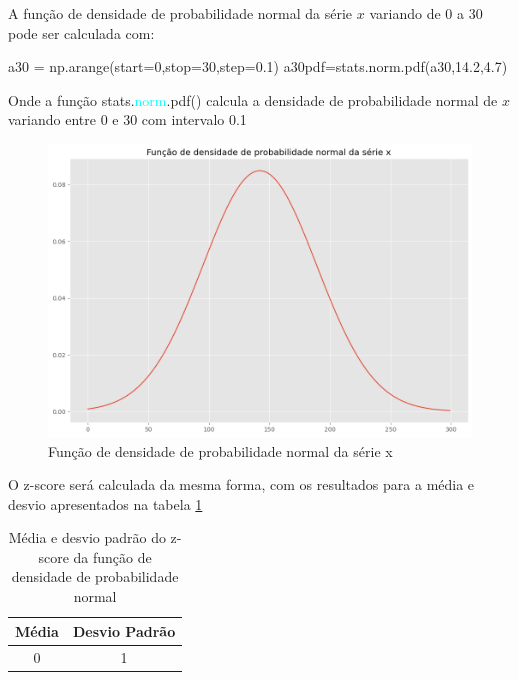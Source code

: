 \documentclass[12pt,a4paper,portuguese]{article}
\begin{document}
A função de densidade de probabilidade normal da série $x$ variando de 0 a 30 pode ser calculada com:
\begin{python}
a30 = np.arange(start=0,stop=30,step=0.1)
a30pdf=stats.norm.pdf(a30,14.2,4.7)
\end{python}
Onde a função stats.\textcolor{cyan}{norm}.pdf() calcula a densidade de probabilidade normal de $x$ variando entre 0 e 30 com intervalo 0.1
\begin{figure}[H]
	\centering
	\includegraphics[width=0.9\linewidth]{lista1-3.3c}
	\caption{Função de densidade de probabilidade normal da série x}
	\label{fig:lista1-3.3c}
\end{figure}
O z-score será calculada da mesma forma, com os resultados para a média e desvio apresentados na tabela \ref*{szsorea30}

			\begin{table}[H]
			\centering
			\begin{tabular}{|c|c|}
				\hline
				Média & Desvio Padrão \\
				\hline
				0 & 1 \\
				\hline
			\end{tabular}
			
			\caption{Média e desvio padrão do z-score da função de densidade de probabilidade normal}
			\label{szsorea30}
		\end{table}	
		
\end{document}
